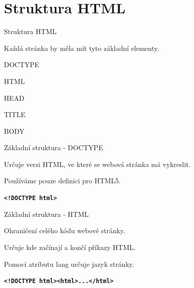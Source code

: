 \documentclass[aspectratio=1610]{beamer}
\begin{document}
\section{Struktura HTML}
\begin{frame}{Struktura HTML}
    \begin{cardTiny}
        \begin{flushleft}
            Každá stránka by měla mít tyto základní elementy.
        \end{flushleft}
    \end{cardTiny}
    \begin{cardTiny}
        \begin{flushleft}
            DOCTYPE

            HTML

            HEAD

            TITLE

            BODY
        \end{flushleft}
    \end{cardTiny}
\end{frame}

\begin{frame}{Základní struktura - DOCTYPE}
    \begin{cardTiny}
        \begin{flushleft}
            Určuje verzi HTML, ve které se webová stránka má vykreslit.

            Používáme pouze definici pro HTML5.
        \end{flushleft}
    \end{cardTiny}
    \begin{cardTiny}
        \begin{flushleft}
        \texttt{\textbf{<!DOCTYPE html>}}
        \end{flushleft}
    \end{cardTiny}
\end{frame}

\begin{frame}{Základní struktura - HTML}
    \begin{cardTiny}
        \begin{flushleft}
            Ohraničení celého kódu webové stránky.

            Určuje kde začínají a končí příkazy HTML.
        
            Pomocí atributu lang určuje jazyk stránky.
        \end{flushleft}
    \end{cardTiny}
    \begin{cardTiny}
        \begin{flushleft}
        \texttt{\textbf{<!DOCTYPE html><html>...</html>}}
        \end{flushleft}
    \end{cardTiny}
\end{frame}
\end{document}
